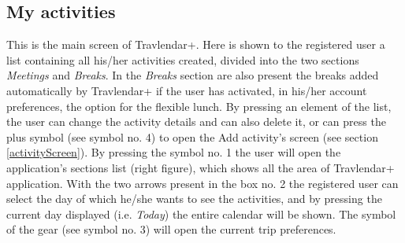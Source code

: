 \documentclass[12pt,titlepage]{article}
\begin{document}
\subsection{My activities}
This is the main screen of Travlendar+. Here is shown to the registered user a list containing all his/her activities created, divided into the two sections \textit{Meetings} and \textit{Breaks}. In the \textit{Breaks} section are also present the breaks added automatically by Travlendar+ if the user has activated, in his/her account preferences, the option for the flexible lunch. By pressing an element of the list, the user can change the activity details and can also delete it, or can press the plus symbol (see symbol no. 4) to open the Add activity's screen (see section \ref{activityScreen}).
By pressing the symbol no. 1 the user will open the application's sections list (right figure), which shows all the area of Travlendar+ application. With the two arrows present in the box no. 2 the registered user can select the day of which he/she wants to see the activities, and by pressing the current day displayed (i.e. \textit{Today}) the entire calendar will be shown. The symbol of the gear (see symbol no. 3) will open the current trip preferences.
\end{document}
